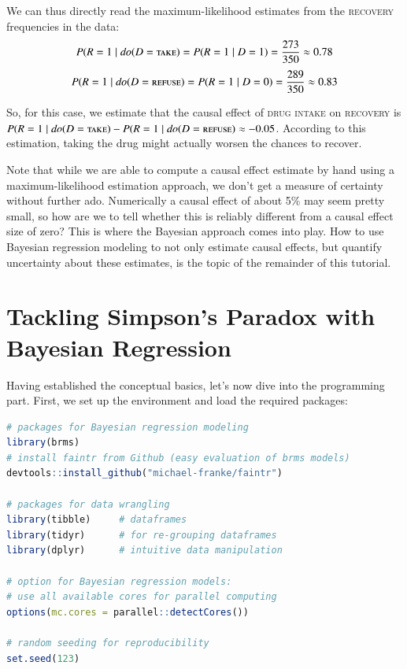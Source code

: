 \documentclass[nobib]{tufte-handout}
\newcommand{\mathdo}{\mathit{do}}
\begin{document}
We can thus directly read the maximum-likelihood estimates from the \textsc{recovery} frequencies in the data:
\begin{equation}
  \begin{split}
    P(R=1\mid \mathdo(D=\textsc{take})
    = P(R=1\mid D=1)
    = \frac{273}{350} \approx 0.78
  \end{split}
\end{equation}
%
\begin{equation}
  \begin{split}
    P(R=1\mid \mathdo(D=\textsc{refuse})
    = P(R=1\mid D=0)
    = \frac{289}{350} \approx 0.83
  \end{split}
\end{equation}

So, for this case, we estimate that the causal effect of \textsc{drug intake} on \textsc{recovery} is $P(R=1\mid \mathdo(D=\textsc{take})-P(R=1\mid \mathdo(D=\textsc{refuse}) \approx -0.05$.
According to this estimation, taking the drug might actually worsen the chances to recover.
\medskip

Note that while we are able to compute a causal effect estimate by hand using a maximum-likelihood estimation approach, we don't get a measure of certainty without further ado. 
Numerically a causal effect of about 5\% may seem pretty small, so how are we to tell whether this is reliably different from a causal effect size of zero?
This is where the Bayesian approach comes into play.
How to use Bayesian regression modeling to not only estimate causal effects, but quantify uncertainty about these estimates, is the topic of the remainder of this tutorial.

\section{Tackling Simpson's Paradox with Bayesian Regression} \label{sec:programming}

Having established the conceptual basics, let's now dive into the programming part. 
First, we set up the environment and load the required packages:
\begin{minipage}[]{\textwidth}
\begin{lstlisting}[language=R]
# packages for Bayesian regression modeling
library(brms) 
# install faintr from Github (easy evaluation of brms models)
devtools::install_github("michael-franke/faintr")

# packages for data wrangling
library(tibble)     # dataframes 
library(tidyr)      # for re-grouping dataframes
library(dplyr)      # intuitive data manipulation

# option for Bayesian regression models: 
# use all available cores for parallel computing
options(mc.cores = parallel::detectCores())

# random seeding for reproducibility
set.seed(123)
\end{lstlisting}
\end{minipage}
\end{document}
